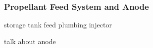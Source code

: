 \subsubsection{Propellant Feed System and Anode}

storage tank
feed plumbing
injector

talk about anode

